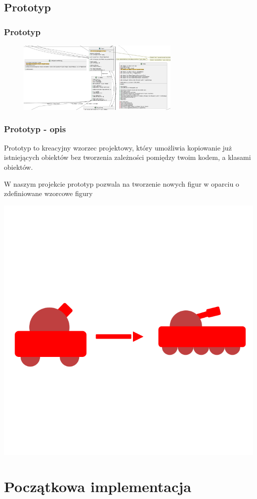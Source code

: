 \documentclass[
	11pt,]{beamer}
\begin{document}
\subsection{Prototyp}

\begin{frame}
	\frametitle{Prototyp}
	\begin{figure}
		\includegraphics[width=0.7\textwidth]{figures/prototyp.pdf}
	\end{figure}
\end{frame}

\begin{frame}
	\frametitle{Prototyp - opis}
	Prototyp to kreacyjny wzorzec projektowy, który umożliwia kopiowanie już istniejących obiektów bez tworzenia zależności pomiędzy twoim kodem, a klasami obiektów.
	
	\vfill
	
	W naszym projekcie prototyp pozwala na tworzenie nowych figur w oparciu o zdefiniowane wzorcowe figury
	
	\begin{center}
    	\includegraphics[width=.25\textwidth]{figures/prototype.png}
    \end{center}
\end{frame}


\section{Początkowa implementacja}
\end{document}

